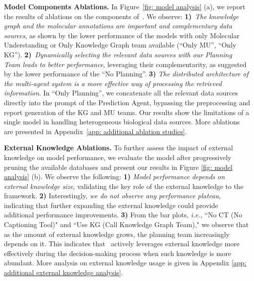 \textbf{Model Components Ablations.}
In Figure~\ref{fig: model analysis} (a), we report the results of ablations on the components of~\proposed. We observe:
\textbf{1)}~\emph{The knowledge graph and the molecular annotations are important and complementary data sources}, as shown by the lower performance of the models with only Molecular Understanding or Only Knowledge Graph team available (``Only MU'', ``Only KG''). 
\textbf{2)}~\emph{Dynamically selecting the relevant data sources with our Planning Team leads to better performance}, leveraging their complementarity, as suggested by the lower performance of the ``No Planning''.
\textbf{3)} 
\emph{The distributed architecture of the multi-agent system is a more effective way of processing the retrieved information}. In ``Only Planning'', we concatenate all the relevant data sources directly into the prompt of the Prediction Agent, bypassing the preprocessing and report generation of the KG and MU teams. Our results show the limitations of a single model in handling heterogeneous biological data sources. More ablations are presented in Appendix~\ref{app: additional ablation studies}.




\textbf{External Knowledge Ablations.}
To further assess the impact of external knowledge on model performance, we evaluate the model after progressively pruning the available databases and present our results in Figure \ref{fig: model analysis} (b). We observe the following:
\textbf{1)} \emph{Model performance depends on external knowledge size}, validating the key role of the external knowledge to the framework.  \textbf{2)} Interestingly, \emph{we do not observe any performance plateau}, indicating that further expanding the external knowledge could provide additional performance improvements.
\textbf{3)} From the bar plots, \emph{i.e.,} ``No CT (No Captioning Tool)" and ``Use KG (Call Knowledge Graph Team)," we observe that as the amount of external knowledge grows, the planning team increasingly depends on it. 
This indicates that \proposed~actively leverages external knowledge more effectively during the decision-making process when such knowledge is more abundant.
More analysis on external knowledge usage is given in Appendix \ref{app: additional external knowledge analysis}.

\vspace{-1ex}
